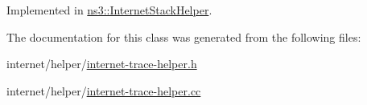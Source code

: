 Implemented in \hyperlink{classns3_1_1InternetStackHelper_a2ddebb75d6e8ce2c2b1b6fb55016ec00}{ns3\+::\+Internet\+Stack\+Helper}.



The documentation for this class was generated from the following files\+:\begin{DoxyCompactItemize}
\item 
internet/helper/\hyperlink{internet-trace-helper_8h}{internet-\/trace-\/helper.\+h}\item 
internet/helper/\hyperlink{internet-trace-helper_8cc}{internet-\/trace-\/helper.\+cc}\end{DoxyCompactItemize}
